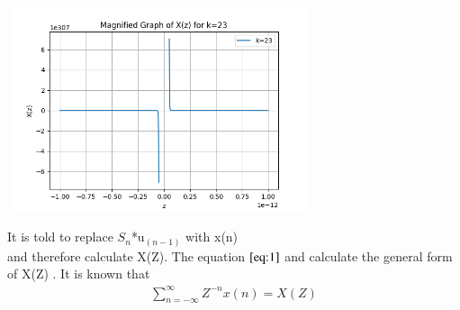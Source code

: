 \documentclass[journal,12pt,twocolumn]{IEEEtran}
\theoremstyle{remark}
\begin{document}
\begin{enumerate}
\graphicspath{ {figs/} }
\includegraphics[width=9cm, height=6cm]{Figure_2}

It is told to replace $S_n$*u$_{(n-1)}$ with x(n) \\and therefore calculate X(Z). The equation $\eqref{eq:1}$ and calculate the general form of X(Z) .
It is known that\\
\begin{align}
 \sum_{n=-\infty}^{\infty} Z^{-n}x(n) = X(Z)\label{eq:3}
 \end{align}


\end{enumerate}
\end{document}
